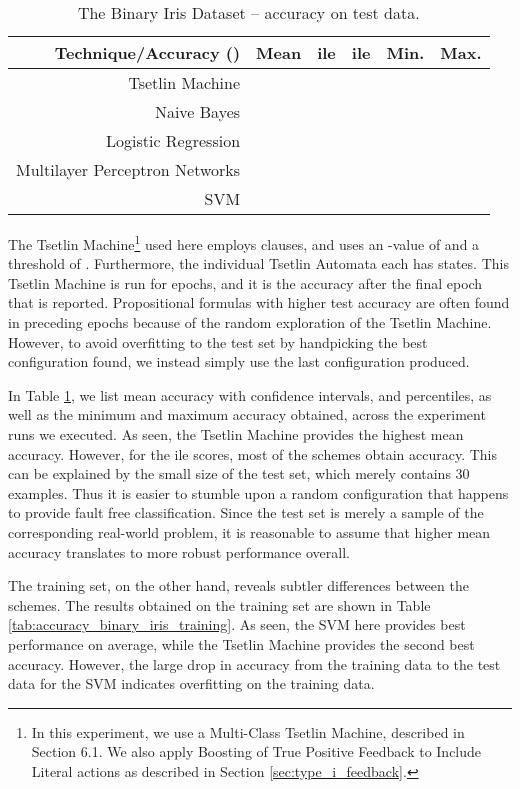 \documentclass[11pt,a4paper]{article}
\begin{document}
\begin{table}[!bh]
    \centering
    \begin{tabular}{r||c|c|c|c|c}
         \bf Technique/Accuracy ()&\bf Mean&\bf ile &\bf ile&\bf Min.&\bf Max.\\
         \hline
    Tsetlin Machine&&&&&\\
    Naive Bayes&&&&&\\
    Logistic Regression&&&&&\\
    Multilayer Perceptron Networks&&&&&\\
    SVM&&&&&
    \end{tabular}
    \caption{The Binary Iris Dataset -- accuracy on test data.}
    \label{tab:accuracy_binary_iris_test}
\end{table}

The Tsetlin Machine\footnote{In this experiment, we use a Multi-Class Tsetlin Machine, described in Section 6.1. We also apply Boosting of True  Positive  Feedback  to  Include  Literal  actions as described in Section \ref{sec:type_i_feedback}.} used here employs  clauses, and uses an -value of  and a threshold  of . Furthermore, the individual Tsetlin Automata each has  states. This Tsetlin Machine is run for  epochs, and it is the accuracy after the final epoch that is reported. 
Propositional formulas with higher test accuracy are often found in preceding epochs because of the random exploration of the Tsetlin Machine. However, to avoid overfitting to the test set by handpicking the best configuration found, we instead simply use the last configuration produced.

In Table \ref{tab:accuracy_binary_iris_test}, we list mean accuracy with  confidence intervals,  and  percentiles, as well as the minimum and maximum accuracy obtained, across the  experiment runs we executed. As seen, the Tsetlin Machine provides the highest mean accuracy. However, for the ile scores, most of the schemes obtain  accuracy. This can be explained by the small size of the test set, which merely contains 30 examples. Thus it is easier to stumble upon a random configuration that happens to provide fault free classification. Since the test set is merely a sample of the corresponding real-world problem, it is reasonable to assume that higher mean accuracy translates to more robust performance overall.

The training set, on the other hand, reveals subtler differences between the schemes. The results obtained on the training set are shown in Table \ref{tab:accuracy_binary_iris_training}.  As seen, the SVM here provides best performance on average, while the Tsetlin Machine provides the second best accuracy. However, the large drop in accuracy from the training data to the test data for the SVM indicates overfitting on the training data.
\end{document}
